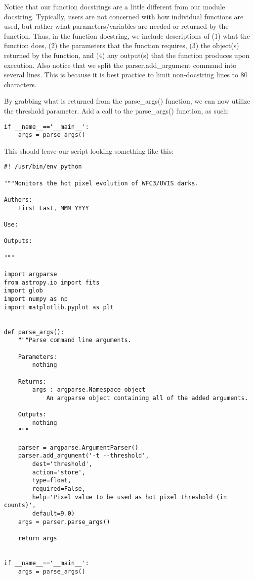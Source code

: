 Notice that our function docstrings are a little different from our module docstring.  Typically,
users are not concerned with how individual functions are used, but rather what parameters/variables
are needed or returned by the function.  Thus, in the function docstring, we include descriptions of 
(1) what the function does, (2) the parameters that the function requires, (3) the object(s) returned 
by the function, and (4) any output(s) that the function produces upon execution.  Also notice that we 
split the {\sf\small parser.add\_argument} command into several lines.  This is
because it is best practice to limit non-docstring lines to 80 characters.

By grabbing what is returned from the {\sf\small parse\_args()} function, we can now
utilize the threshold parameter.  Add a call to the {\sf\small parse\_args()} function,
as such:

\begin{verbatim}
if __name__=='__main__':
    args = parse_args()
\end{verbatim}

This should leave our script looking something like this:

\begin{verbatim}
#! /usr/bin/env python

"""Monitors the hot pixel evolution of WFC3/UVIS darks.

Authors:
    First Last, MMM YYYY

Use:

Outputs:

"""

import argparse
from astropy.io import fits
import glob
import numpy as np
import matplotlib.pyplot as plt


def parse_args():
    """Parse command line arguments.

    Parameters:
        nothing

    Returns:
        args : argparse.Namespace object
            An argparse object containing all of the added arguments.

    Outputs:
        nothing
    """

    parser = argparse.ArgumentParser()
    parser.add_argument('-t --threshold',
        dest='threshold',
        action='store',
        type=float,
        required=False,
        help='Pixel value to be used as hot pixel threshold (in counts)',
        default=9.0)
    args = parser.parse_args()

    return args


if __name__=='__main__':
    args = parse_args()

\end{verbatim}

